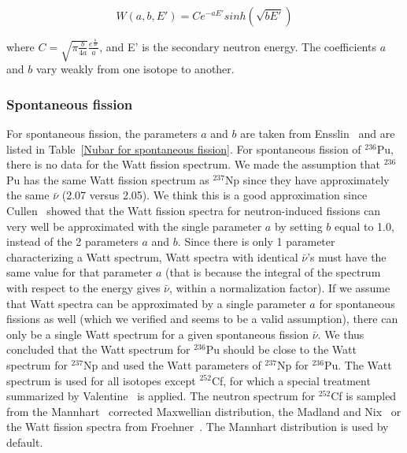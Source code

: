 \begin{equation}
W(a,b,E') = Ce^{-aE'}sinh(\sqrt{bE'})
\label{eq:Watt spectrum equation}
\end{equation}

where $C=\sqrt{\pi\frac{b}{4a}}\frac{e^{\frac{b}{4a}}}{a}$, and 
E' is the secondary neutron energy. The coefficients $a$ and $b$ 
vary weakly from one isotope to another.

\subsubsection*{Spontaneous fission}
For spontaneous fission, the parameters $a$ and $b$ are taken from 
Ensslin~\cite{Ensslin 1998} and are listed in 
Table~\ref{Nubar for spontaneous fission}. For spontaneous fission 
of $^{236}$Pu, there is no data for the Watt fission spectrum. We 
made the assumption that $^{236}$Pu has the same Watt fission 
spectrum as $^{237}$Np since they have approximately the same 
$\bar{\nu}$ (2.07 versus 2.05). We think this is a good 
approximation since Cullen~\cite{Cullen 2004} showed that the Watt 
fission spectra for neutron-induced fissions can very well be 
approximated with the single parameter $a$ by setting $b$ equal to 
1.0, instead of the 2 parameters $a$ and $b$. Since there is only 1 
parameter characterizing a Watt spectrum, Watt spectra with 
identical $\bar{\nu}$'s must have the same value for that 
parameter $a$ (that is because the integral of the spectrum with 
respect to the energy gives $\bar{\nu}$, within a normalization 
factor). If we assume that Watt spectra can be approximated by a 
single parameter $a$ for spontaneous fissions as well (which we 
verified and seems to be a valid assumption), there can only be 
a single Watt spectrum for a given spontaneous fission 
$\bar{\nu}$. We thus concluded that the Watt spectrum for 
$^{236}$Pu should be close to the Watt spectrum for $^{237}$Np 
and used the Watt parameters of $^{237}$Np for $^{236}$Pu. The 
Watt spectrum is used for all isotopes except $^{252}$Cf, for 
which a special treatment summarized by 
Valentine~\cite{Valentine 2000} is applied. The neutron 
spectrum for $^{252}$Cf is sampled from the 
Mannhart~\cite{Mannhart 1987} corrected Maxwellian 
distribution, the Madland and Nix~\cite{Madland 1984} or the 
Watt fission spectra from Froehner~\cite{Froehner 1990}. 
 The Mannhart 
distribution is used by default.

